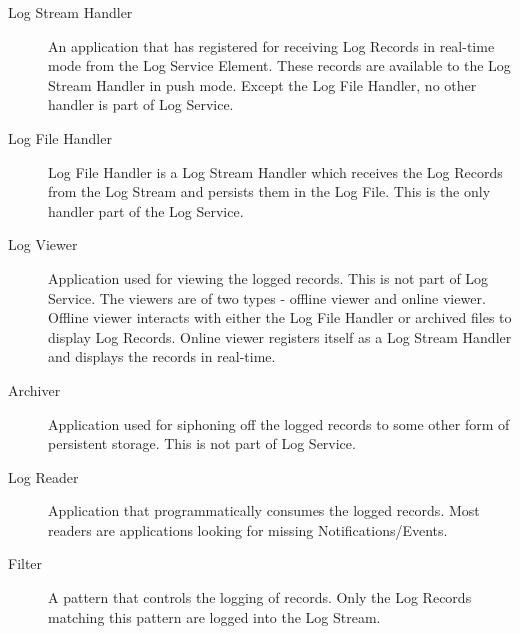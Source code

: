 \begin{flushleft}
\begin{Desc}
\begin{description}
\item[Log Stream Handler] An application that has registered for receiving Log Records in real-time mode from the Log Service Element. These records 
are available to the Log Stream Handler in push mode. Except the Log File Handler, no other handler is part of Log Service.
\end{description}

\begin{description}
\item[Log File Handler] Log File Handler is a Log Stream Handler which receives the Log Records from the Log Stream and persists them in the Log File. 
This is the only handler part of the Log Service.
\end{description}


\begin{description}
\item[Log Viewer] Application used for viewing the logged records. This is not part of Log Service. The viewers are of two types - offline viewer and 
online viewer. Offline viewer interacts with either the Log File Handler or archived files to display Log Records. Online viewer registers itself as 
a Log Stream Handler and displays the records in real-time.
\end{description}


\begin{description}
\item[Archiver] Application used for siphoning off the logged records to some other form of persistent storage. This is not part of Log Service.
\end{description}

\begin{description}
\item[Log Reader] Application that programmatically consumes the logged records. Most readers are applications looking for missing 
Notifications/Events.
\end{description}


\begin{description}
\item[Filter] A pattern that controls the logging of records. Only the Log Records matching this pattern are logged into the Log Stream.
\end{description}


\end{Desc}



\end{flushleft}